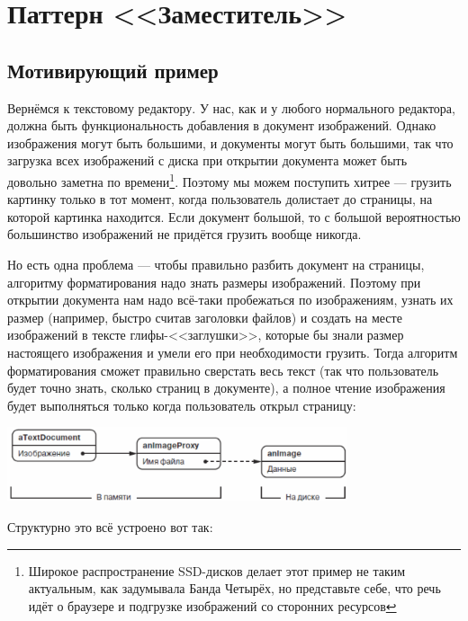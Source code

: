 \documentclass{../text-style}
\begin{document}
\section{Паттерн <<Заместитель>>}

\subsection{Мотивирующий пример}

Вернёмся к текстовому редактору. У нас, как и у любого нормального редактора, должна быть функциональность добавления в документ изображений. Однако изображения могут быть большими, и документы могут быть большими, так что загрузка всех изображений с диска при открытии документа может быть довольно заметна по времени\footnote{Широкое распространение SSD-дисков делает этот пример не таким актуальным, как задумывала Банда Четырёх, но представьте себе, что речь идёт о браузере и подгрузке изображений со сторонних ресурсов}. Поэтому мы можем поступить хитрее --- грузить картинку только в тот момент, когда пользователь долистает до страницы, на которой картинка находится. Если документ большой, то с большой вероятностью большинство изображений не придётся грузить вообще никогда.

Но есть одна проблема --- чтобы правильно разбить документ на страницы, алгоритму форматирования надо знать размеры изображений. Поэтому при открытии документа нам надо всё-таки пробежаться по изображениям, узнать их размер (например, быстро считав заголовки файлов) и создать на месте изображений в тексте глифы-<<заглушки>>, которые бы знали размер настоящего изображения и умели его при необходимости грузить. Тогда алгоритм форматирования сможет правильно сверстать весь текст (так что пользователь будет точно знать, сколько страниц в документе), а полное чтение изображения будет выполняться только когда пользователь открыл страницу:

\begin{center}
    \includegraphics[width=0.75\textwidth]{proxyExample.png}
\end{center}

Структурно это всё устроено вот так:
\end{document}
